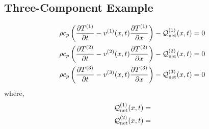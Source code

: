 \subsection{Three-Component Example}

\begin{subequations}
    \begin{align}
        \rho c_p \left(\frac{\partial T^{(1)}}{\partial t} - v^{(1)}(x,t)\frac{\partial T^{(1)}}{\partial x}\right) - \mathcal{Q}^{(1)}_{\text{net}}(x,t) &= 0\\
        \rho c_p \left(\frac{\partial T^{(2)}}{\partial t} - v^{(2)}(x,t)\frac{\partial T^{(2)}}{\partial x}\right) - \mathcal{Q}^{(2)}_{\text{net}}(x,t) &= 0\\
        \rho c_p \left(\frac{\partial T^{(3)}}{\partial t} - v^{(3)}(x,t)\frac{\partial T^{(3)}}{\partial x}\right) - \mathcal{Q}^{(3)}_{\text{net}}(x,t) &= 0\\
    \end{align}
\end{subequations}
where,
\begin{subequations}
    \begin{align}
        \mathcal{Q}^{(1)}_{\text{net}}(x,t) &=\\
        \mathcal{Q}^{(2)}_{\text{net}}(x,t) &=\\
    \end{align}
\end{subequations}
